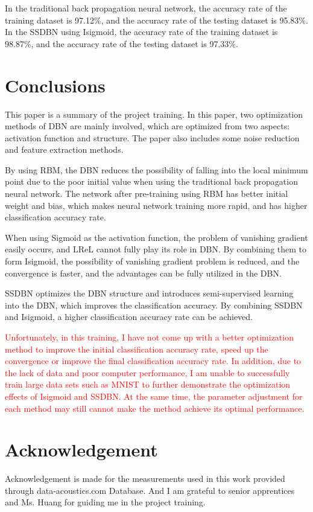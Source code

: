 \documentclass{bioinfo}
\begin{document}
In the traditional back propagation neural network, the accuracy rate of the training dataset is 97.12\%, and the accuracy rate of the testing dataset is 95.83\%. In the SSDBN using Isigmoid, the accuracy rate of the training dataset is 98.87\%, and the accuracy rate of the testing dataset is 97.33\%.

\section{Conclusions}
This paper is a summary of the project training. In this paper, two optimization methods of DBN are mainly involved, which are optimized from two aspects: activation function and structure. The paper also includes some noise reduction and feature extraction methods.

By using RBM, the DBN reduces the possibility of falling into the local minimum point due to the poor initial value when using the traditional back propagation neural network. The network after pre-training using RBM has better initial weight and bias, which makes neural network training more rapid, and has higher classification accuracy rate.

When using Sigmoid as the activation function, the problem of vanishing gradient easily occurs, and LReL cannot fully play its role in DBN. By combining them to form Isigmoid, the possibility of vanishing gradient problem is reduced, and the convergence is faster, and the advantages can be fully utilized in the DBN.

SSDBN optimizes the DBN structure and introduces semi-supervised learning into the DBN, which improves the classification accuracy. By combining SSDBN and Isigmoid, a higher classification accuracy rate can be achieved.

\textcolor{red}{Unfortunately, in this training, I have not come up with a better optimization method to improve the initial classification accuracy rate, speed up the convergence or improve the final classification accuracy rate. In addition, due to the lack of data and poor computer performance, I am unable to successfully train large data sets such as MNIST to further demonstrate the optimization effects of Isigmoid and SSDBN. At the same time, the parameter adjustment for each method may still cannot make the method achieve its optimal performance.}


\section*{Acknowledgement}
Acknowledgement is made for the measurements used in this work provided through data-acoustics.com Database. And I am grateful to senior apprentices and Ms. Huang for guiding me in the project training.




 
\end{document}
